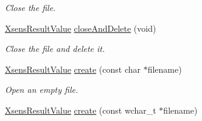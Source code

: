 \begin{DoxyCompactItemize}
\begin{DoxyCompactList}\small\item\em \-Close the file. \end{DoxyCompactList}\item 
\hypertarget{classxsens_1_1Cmt1f_a7f88bf518daead18acd478c53874f59e}{\hyperlink{group__enums_ga822a2260a20af524029eef9e9a51ff6f}{\-Xsens\-Result\-Value} \hyperlink{classxsens_1_1Cmt1f_a7f88bf518daead18acd478c53874f59e}{close\-And\-Delete} (void)}\label{classxsens_1_1Cmt1f_a7f88bf518daead18acd478c53874f59e}

\begin{DoxyCompactList}\small\item\em \-Close the file and delete it. \end{DoxyCompactList}\item 
\hypertarget{classxsens_1_1Cmt1f_afe9e7fd93967527fcabfdc0e248f9acc}{\hyperlink{group__enums_ga822a2260a20af524029eef9e9a51ff6f}{\-Xsens\-Result\-Value} \hyperlink{classxsens_1_1Cmt1f_afe9e7fd93967527fcabfdc0e248f9acc}{create} (const char $\ast$filename)}\label{classxsens_1_1Cmt1f_afe9e7fd93967527fcabfdc0e248f9acc}

\begin{DoxyCompactList}\small\item\em \-Open an empty file. \end{DoxyCompactList}\item 
\hypertarget{classxsens_1_1Cmt1f_ae45a131665d3f94c209d51bdb382425c}{\hyperlink{group__enums_ga822a2260a20af524029eef9e9a51ff6f}{\-Xsens\-Result\-Value} \hyperlink{classxsens_1_1Cmt1f_ae45a131665d3f94c209d51bdb382425c}{create} (const wchar\-\_\-t $\ast$filename)}\label{classxsens_1_1Cmt1f_ae45a131665d3f94c209d51bdb382425c}


\end{DoxyCompactItemize}
